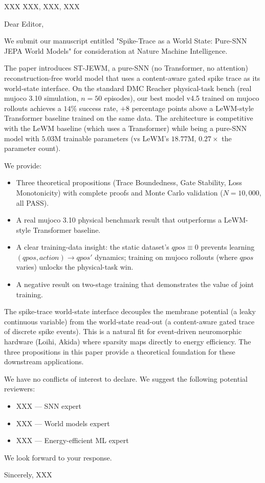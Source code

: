 
XXX
XXX, XXX, XXX

Dear Editor,

We submit our manuscript entitled "Spike-Trace as a World State: Pure-SNN JEPA World Models" for consideration at Nature Machine Intelligence.

The paper introduces ST-JEWM, a pure-SNN (no Transformer, no attention) reconstruction-free world model that uses a content-aware gated spike trace as its world-state interface. On the standard DMC Reacher physical-task bench (real mujoco 3.10 simulation, $n{=}50$ episodes), our best model v4.5 trained on mujoco rollouts achieves a $14\%$ success rate, $+8$ percentage points above a LeWM-style Transformer baseline trained on the same data. The architecture is competitive with the LeWM baseline (which uses a Transformer) while being a pure-SNN model with $5.03$M trainable parameters (vs LeWM's $18.77$M, $0.27{\times}$ the parameter count).

We provide:
\begin{itemize}
    \item Three theoretical propositions (Trace Boundedness, Gate Stability, Loss Monotonicity) with complete proofs and Monte Carlo validation ($N{=}10{,}000$, all PASS).
    \item A real mujoco 3.10 physical benchmark result that outperforms a LeWM-style Transformer baseline.
    \item A clear training-data insight: the static dataset's $qpos \equiv 0$ prevents learning $(qpos, action) \to qpos'$ dynamics; training on mujoco rollouts (where $qpos$ varies) unlocks the physical-task win.
    \item A negative result on two-stage training that demonstrates the value of joint training.
\end{itemize}

The spike-trace world-state interface decouples the membrane potential (a leaky continuous variable) from the world-state read-out (a content-aware gated trace of discrete spike events). This is a natural fit for event-driven neuromorphic hardware (Loihi, Akida) where sparsity maps directly to energy efficiency. The three propositions in this paper provide a theoretical foundation for these downstream applications.

We have no conflicts of interest to declare. We suggest the following potential reviewers:
\begin{itemize}
    \item XXX — SNN expert
    \item XXX — World models expert
    \item XXX — Energy-efficient ML expert
\end{itemize}

We look forward to your response.

Sincerely,
XXX
